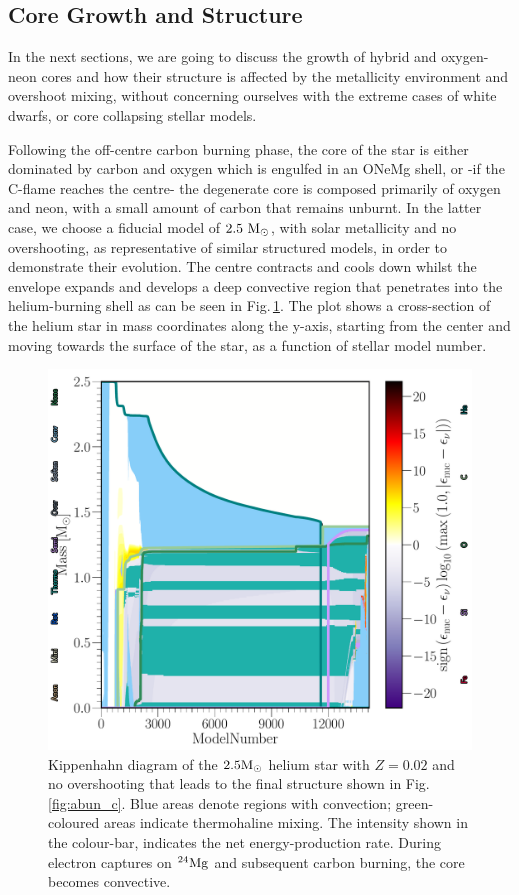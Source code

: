 \documentclass[../../main/thesis_msc.tex]{subfiles}
\begin{document}
    \subsection{Core Growth and Structure} \label{sec:coreGrowth}
    
    In the next sections, we are going to discuss the growth of hybrid and oxygen-neon cores and how their structure is affected by the metallicity environment and overshoot mixing, without concerning ourselves with the extreme cases of white dwarfs, or core collapsing stellar models.
    
    Following the off-centre carbon burning phase, the core of the star is either dominated by carbon and oxygen which is engulfed in an ONeMg shell, or -if the C-flame reaches the centre- the degenerate core is composed primarily of oxygen and neon, with a small amount of carbon that remains unburnt. In the latter case, we choose a fiducial model of $\rm 2.5 \ M_{\odot}$, with solar metallicity and no overshooting, as representative of similar structured models, in order to demonstrate their evolution. The centre contracts and cools down whilst the envelope expands and develops a deep convective region that penetrates into the helium-burning shell as can be seen in Fig.\,\ref{fig:Kipp}. The plot shows a cross-section of the helium star in mass coordinates along the y-axis, starting from the center and moving towards the surface of the star, as a function of stellar model number.
    
    
    
    \begin{figure}[t]
        \centering
        \includegraphics[width=0.5\columnwidth]{../figures/chapter4/Kipp_2p5_0p02_0p0.pdf}
        \caption{Kippenhahn diagram of the $2.5 \rm M_{\odot}$ helium star with $Z = 0.02$ and no overshooting that leads to the final structure shown in Fig.\,\ref{fig:abun_c}. Blue areas denote regions with convection; green-coloured areas indicate thermohaline mixing. The intensity shown in the colour-bar, indicates the net energy-production rate. During electron captures on $\rm ^{24}Mg$ and subsequent carbon burning, the core becomes convective.}
        \label{fig:Kipp}
    \end{figure}
    
\end{document}
